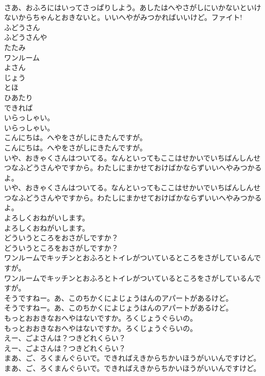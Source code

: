 \documentclass[8pt]{extreport}
\begin{document}
\begin{CJK}{UTF8}{min}
\\	さあ、おふろにはいってさっぱりしよう。あしたはへやさがしにいかないといけないからちゃんとおきないと。いいへやがみつかればいいけど。ファイト! 
\\	ふどうさん
\\	ふどうさんや
\\	たたみ
\\	ワンルーム
\\	よさん
\\	じょう
\\	とほ
\\	ひあたり
\\	できれば
\\	いらっしゃい。	
\\	いらっしゃい。 
\\	こんにちは。へやをさがしにきたんですが。	
\\	こんにちは。へやをさがしにきたんですが。 
\\	いや、おきゃくさんはついてる。なんといってもここはせかいでいちばんしんせつなふどうさんやですから。わたしにまかせておけばかならずいいへやみつかるよ。	
\\	いや、おきゃくさんはついてる。なんといってもここはせかいでいちばんしんせつなふどうさんやですから。わたしにまかせておけばかならずいいへやみつかるよ。 
\\	よろしくおねがいします。	
\\	よろしくおねがいします。 
\\	どういうところをおさがしですか？	
\\	どういうところをおさがしですか？ 
\\	ワンルームでキッチンとおふろとトイレがついているところをさがしているんですが。	
\\	ワンルームでキッチンとおふろとトイレがついているところをさがしているんですが。 
\\	そうですねー。あ、このちかくによじょうはんのアパートがあるけど。	
\\	そうですねー。あ、このちかくによじょうはんのアパートがあるけど。 
\\	もっとおおきなおへやはないですか。ろくじょうぐらいの。	
\\	もっとおおきなおへやはないですか。ろくじょうぐらいの。 
\\	えー、ごよさんは？つきどれくらい？	
\\	えー、ごよさんは？つきどれくらい？ 
\\	まあ、ご、ろくまんぐらいで。できればえきからちかいほうがいいんですけど。	
\\	まあ、ご、ろくまんぐらいで。できればえきからちかいほうがいいんですけど。 

\end{CJK}
\end{document}
